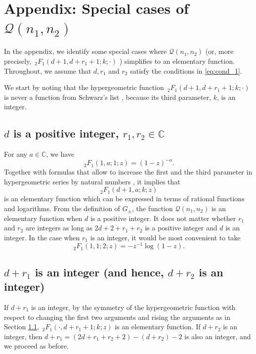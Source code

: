 \documentclass[]{article}
\newcommand{\kf}[1]{{\color{magenta}{#1}}}
\begin{document}
 \section{Appendix: Special cases of $\mathcal{Q}(n_1,n_2)$}\label{sec:appendix}
  In the appendix, we identify some special cases where $\mathcal{Q}(n_1,n_2)$ (or, more precisely, $\, _2 F_1 (d+1,d+r_1+1;k;\cdot )$ ) simplifies to an elementary function. 
  Throughout, we assume that $d, r_1$ and $r_2$
 satisfy the conditions in \eqref{eq:cond_1}.
  
  We start by noting that the hypergeometric function $\, _2 F_1 (d+1,d+r_1+1;k;\cdot )$ is never a function from Schwarz's list \cite{schwarz1873ueber}, because its third parameter, $k$,  is an integer. 
\subsection{$d$ is a positive integer, $r_1, r_2 \in \mathbb{C}$}\label{eq:sec_sdddfkkeee}

For any $a \in \mathbb{C}$, we have  
\begin{equation}
    \, _2F_1(1,a;1;z) = (1-z)^{-a}.
\end{equation}
Together with formulas that allow to increase the first and the third parameter in hypergeometric series by natural numbers \cite[15.5.3, 15.5.6]{NIST},
 it implies that  
\begin{equation}
\, _2 F_1 (d+1,a;k; z)
\end{equation}
is an elementary function which can be expressed in terms of rational functions and logarithms. From the definition of $G_\pm$, the function $\mathcal{Q}(n_1, n_2)$ is an elementary function when $d$ is a positive integer. It does not matter whether $r_1$ and $r_2$ are integers as long as $2d+2+r_1+r_2$ is a positive integer and $d$ is an integer.
In the case when $r_1$ is an integer, it would be most convenient to take 
\begin{equation}
\, _2F_1(1,1;2;z) = -z^{-1} \log(1 - z).
\end{equation}

\subsection{$d + r_1$ is an integer (and hence, $d + r_2$ is an integer)}
If $d+r_1$ is an integer, by the symmetry of the hypergeometric function with respect to changing the first two arguments and rising the arguments as in Section \ref{eq:sec_sdddfkkeee}, 
$
    \, _2 F_1 (\cdot , d+r_1+1 ;k; z)
$
is an elementary function. If $d+r_2$ is an integer, then $d+r_1 = (2d+r_1+r_2+2)  - (d+r_2) - 2$ is also an integer, and we proceed as before.
\end{document}
